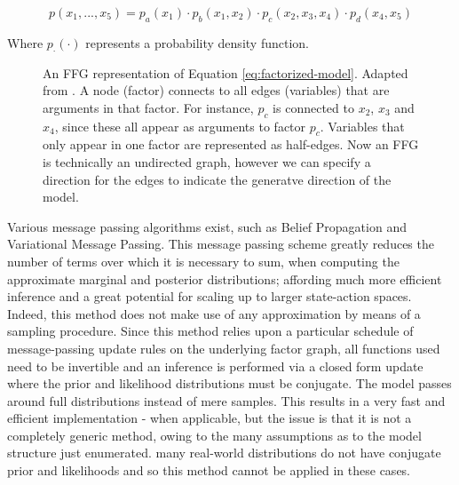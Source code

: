 \documentclass[onecolumn]{IEEEtran}
\begin{document}
\begin{equation}
p(x_1, ..., x_5) = p_a(x_1) \cdot p_b(x_1, x_2) \cdot p_c(x_2, x_3, x_4) \cdot p_d(x_4, x_5) \label{eq:factorized-model}
\end{equation}

Where $p_\cdot(\cdot)$ represents a probability density function.

\begin{figure}[htbp]
  \centering
  \caption{An FFG representation of Equation \ref{eq:factorized-model}. Adapted from \textcite{Factor-Graph-Approach-Automated-Design-Bayesian-Algos}. A node (factor) connects to all edges (variables) that are arguments in that factor. For instance, $p_c$ is connected to $x_2$, $x_3$ and $x_4$, since these all appear as arguments to factor $p_c$. Variables that only appear in one factor are represented as half-edges. Now an FFG is technically an undirected graph, however we can specify a direction for the edges to indicate the generatve direction of the model.}
  \label{fig:factor-graph}
\end{figure}



Various message passing algorithms exist, such as Belief Propagation and Variational Message Passing. This message passing scheme greatly reduces the number of terms over which it is necessary to sum, when computing the approximate marginal and posterior distributions; affording much more efficient inference and a great potential for scaling up to larger state-action spaces. Indeed, this method does not make use of any approximation by means of a sampling procedure. Since this method relies upon a particular schedule of message-passing update rules on the underlying factor graph, all functions used need to be invertible and an inference is performed via a closed form update where the prior and likelihood distributions must be conjugate. The model passes around full distributions instead of mere samples. This results in a very fast and efficient implementation - when applicable, but the issue is that it is not a completely generic method, owing to the many assumptions as to the model structure just enumerated. many real-world distributions do not have conjugate prior and likelihoods and so this method cannot be applied in these cases.
\end{document}
